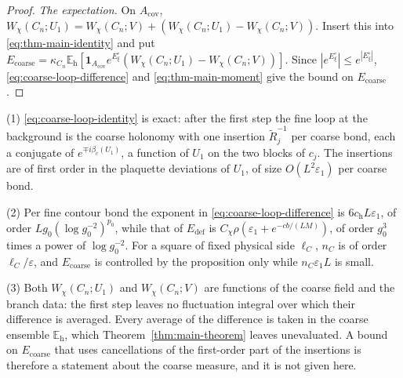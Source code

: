 \begin{proof}
\emph{The expectation.} On $A_{\mathrm{cov}}$, $W_{\chi}(C_n;U_1)= W_{\chi}(C_n;V)+(W_{\chi}(C_n;U_1)-W_{\chi}(C_n;V))$. Insert this into \eqref{eq:thm-main-identity} and put $E_{\mathrm{coarse}}=\kappa_{C_n}\mathbb E_{\mathrm h}[\mathbf 1_{A_{\mathrm{cov}}}e^{E^{\circ}_{\xi}}(W_{\chi}(C_n;U_1)-W_{\chi}(C_n;V))]$. Since $| e^{E^{\circ}_{\xi}}|\leqslant e^{| E^{\circ}_{\xi}|}$, \eqref{eq:coarse-loop-difference} and \eqref{eq:thm-main-moment} give the bound on $E_{\mathrm{coarse}}$.
\end{proof}

\begin{remark}\label{rem:coarse-loop-form}
(1) \eqref{eq:coarse-loop-identity} is exact: after the first step the fine loop at the background is the coarse holonomy with one insertion $\widetilde R_j^{-1}$ per coarse bond, each a conjugate of $e^{\mp i\beta_c(U_1)}$, a function of $U_1$ on the two blocks of $c_j$. The insertions are of first order in the plaquette deviations of $U_1$, of size $O(L^2\varepsilon_1)$ per coarse bond.

(2) Per fine contour bond the exponent in \eqref{eq:coarse-loop-difference} is $6c_{\mathrm h}L\varepsilon_1$, of order $Lg_0(\log g_0^{-2})^{p_0}$, while that of $E_{\mathrm{def}}$ is $C_{\chi}\rho(\varepsilon_1+e^{-cb/(LM)})$, of order $g_0^3$ times a power of $\log g_0^{-2}$. For a square of fixed physical side $\ell_C$, $n_C$ is of order $\ell_C/\varepsilon$, and $E_{\mathrm{coarse}}$ is controlled by the proposition only while $n_C\varepsilon_1L$ is small.

(3) Both $W_{\chi}(C_n;U_1)$ and $W_{\chi}(C_n;V)$ are functions of the coarse field and the branch data: the first step leaves no fluctuation integral over which their difference is averaged. Every average of the difference is taken in the coarse ensemble $\mathbb E_{\mathrm h}$, which Theorem~\ref{thm:main-theorem} leaves unevaluated. A bound on $E_{\mathrm{coarse}}$ that uses cancellations of the first-order part of the insertions is therefore a statement about the coarse measure, and it is not given here.
\end{remark}
